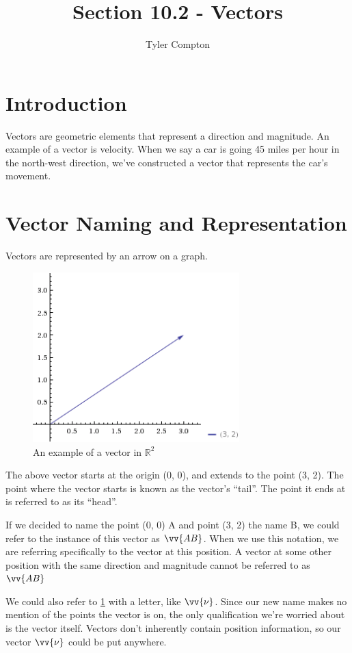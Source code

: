 \documentclass{article}
\author{Tyler Compton}
\title{Section 10.2 - Vectors}
\begin{document}
\maketitle
\tableofcontents

\section{Introduction}
Vectors are geometric elements that represent a direction and magnitude. An
example of a vector is velocity. When we say a car is going 45 miles per hour
in the north-west direction, we've constructed a vector that represents the
car's movement.

\section{Vector Naming and Representation}
Vectors are represented by an arrow on a graph.

\begin{figure}[H]
	\centering
	\includegraphics[width=8cm]{vector}
	\caption{An example of a vector in $\mathbb{R}^2$}
	\label{fig:vector}
\end{figure}

The above vector starts at the origin (0, 0), and extends to the point (3, 2).
The point where the vector starts is known as the vector's ``tail''. The point
it ends at is referred to as its ``head''.

If we decided to name the point (0, 0) A and point (3, 2) the name B, we could
refer to the instance of this vector as $\vv{AB}$. When we use this notation,
we are referring specifically to the vector at this position. A vector at some
other position with the same direction and magnitude cannot be referred to as
$\vv{AB}$

We could also refer to \ref{fig:vector} with a letter, like $\vv{\nu}$. Since
our new name makes no mention of the points the vector is on, the only
qualification we're worried about is the vector itself. Vectors don't
inherently contain position information, so our vector $\vv{\nu}$ could be put
anywhere.
\end{document}
